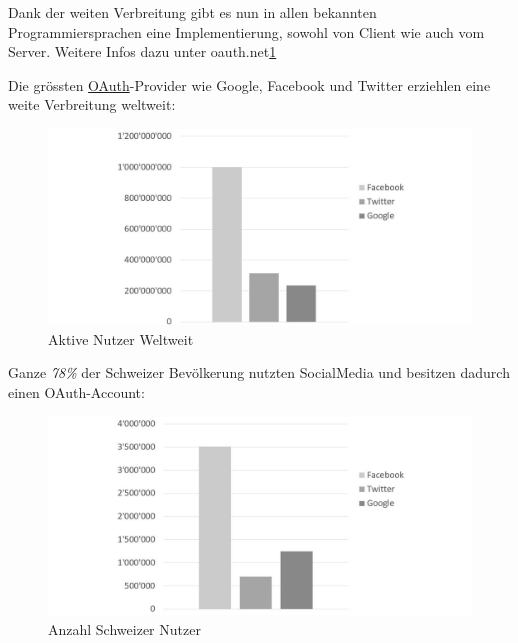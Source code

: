 Dank der weiten Verbreitung gibt es nun in allen bekannten
Programmiersprachen eine Implementierung, sowohl von Client wie auch vom
Server. Weitere Infos dazu unter oauth.net\href{http://oauth.net/2/}{1}

Die grössten \protect\hyperlink{oauth-1}{OAuth}-Provider wie Google,
Facebook und Twitter erziehlen eine weite Verbreitung weltweit:

\begin{figure}[htbp]
\centering
\includegraphics{images/excel-statistik/socialmedia-aktivenutzer.jpg}
\caption[Aktive Nutzer Weltweit ]{Aktive Nutzer Weltweit
\footnotemark{}}
\end{figure}

Ganze \emph{78\%} \autocite{goldbachsocial} der Schweizer Bevölkerung
nutzten SocialMedia und besitzen dadurch einen OAuth-Account:

\begin{figure}[htbp]
\centering
\includegraphics{images/excel-statistik/socialmedia-schweiz.jpg}
\caption[Anzahl Schweizer Nutzer ]{Anzahl Schweizer Nutzer
\footnotemark{}}
\end{figure}

